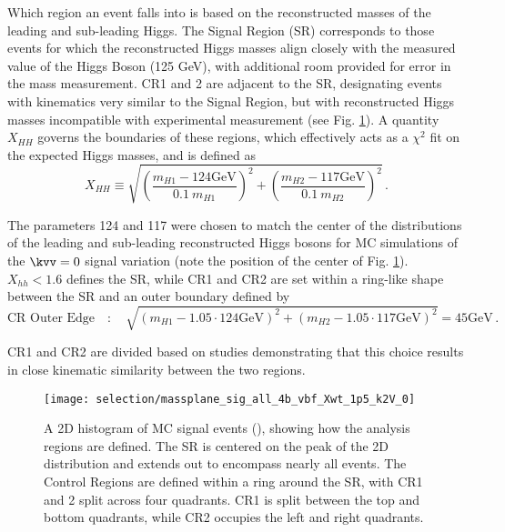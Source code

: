         Which region an event falls into is based on the reconstructed masses of the leading and sub-leading Higgs.
        The Signal Region (SR) corresponds to those events for which the reconstructed Higgs masses
            align closely with the measured value of the Higgs Boson (125 GeV),
            with additional room provided for error in the mass measurement.
        CR1 and 2 are adjacent to the SR, designating events with kinematics very similar to the Signal Region,
            but with reconstructed Higgs masses incompatible with experimental measurement (see Fig. \ref{fig:region_definition}).
        A quantity $X_{HH}$ governs the boundaries of these regions,
            which effectively acts as a $\chi^2$ fit on the expected Higgs masses,
            and is defined as
        \begin{equation} \label{eq:xhh}
            X_{HH} \equiv \sqrt{\left(\frac{m_{H1} - 124\textrm{GeV}}{0.1 \ m_{H1}}\right)^{2}
                + \left(\frac{m_{H2} - 117\textrm{GeV}}{0.1 \ m_{H2}}\right)^{2}}
            \,.
        \end{equation}

        The \mhh parameters 124 and 117 were chosen to match the center of the \mhh distributions
            of the leading and sub-leading reconstructed Higgs bosons for
            MC simulations of the $\kvv = 0$ signal variation
            (note the position of the center of Fig. \ref{fig:region_definition}).
        $X_{hh} < 1.6$ defines the SR,
            while CR1 and CR2 are set within a ring-like shape between the SR
            and an outer boundary defined by
        \begin{equation} \label{eq:cr_out}
            \text{CR\ Outer\ Edge} \quad : \quad \sqrt{ \left(m_{H1} - 1.05 \cdot 124\textrm{GeV}\right)^2
                +  \left(m_{H2} - 1.05 \cdot 117\textrm{GeV}\right)^2 } = 45\textrm{GeV}
            \,.
        \end{equation}
        
        CR1 and CR2 are divided based on studies demonstrating that this choice results in
            close kinematic similarity between the two regions.

        \begin{figure}[tbh]
            \texttt{[image: selection/massplane\_sig\_all\_4b\_vbf\_Xwt\_1p5\_k2V\_0]}
            \caption{
                A 2D histogram of MC signal events (), showing how the analysis regions are defined.
                The SR is centered on the peak of the 2D distribution and extends out to encompass nearly all events.
                The Control Regions are defined within a ring around the SR,
                    with CR1 and 2 split across four quadrants.
                CR1 is split between the top and bottom quadrants,
                    while CR2 occupies the left and right quadrants.
                \cite{hh4b_2021_int_note}
            }
            \label{fig:region_definition}
        \end{figure}

